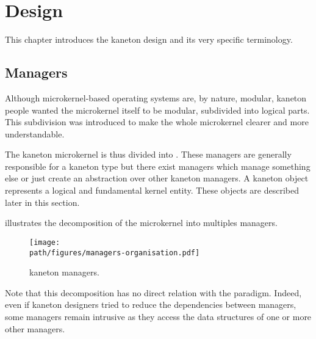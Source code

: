 %
%
%
%
%
%

%
%

\chapter{Design}
\label{chapter:design}

This chapter introduces the kaneton design and its very specific terminology.

\newpage

%
%

%
%

\section{Managers}

Although microkernel-based operating systems are, by nature, modular, kaneton
people wanted the microkernel itself to be modular, subdivided into logical
parts. This subdivision was introduced to make the whole microkernel clearer
and more understandable.

The kaneton microkernel is thus divided into . These
managers are generally responsible for a kaneton  type but there
exist managers which manage something else or just create an abstraction over
other kaneton managers. A kaneton object represents a logical and fundamental
kernel entity. These objects are described later in this section.

 illustrates the
decomposition of the microkernel into multiples managers.

\begin{figure}[h]
  \begin{center}
    \texttt{[image: \\path/figures/managers-organisation.pdf]}
    \caption{kaneton managers.}
    \label{figure:managers-organisation}
  \end{center}
\end{figure}

Note that this decomposition has no direct relation with the
 paradigm. Indeed, even if kaneton
designers tried to reduce the dependencies between managers, some managers
remain intrusive as they access the data structures of one or more other
managers.


